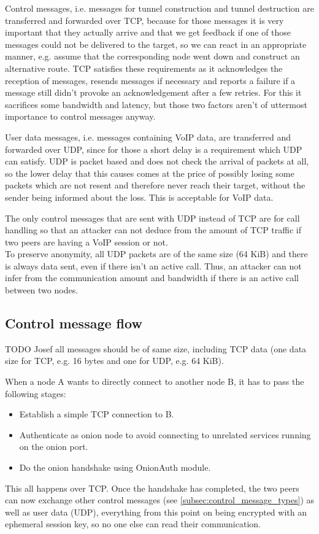 \documentclass{article}
\begin{document}
Control messages, i.e. messages for tunnel construction and tunnel destruction are transferred and forwarded over TCP, because for those messages it is very important that they actually arrive and that we get feedback if one of those messages could not be delivered to the target, so we can react in an appropriate manner, e.g. assume that the corresponding node went down and construct an alternative route. TCP satisfies these requirements as it acknowledges the reception of messages, resends messages if necessary and reports a failure if a message still didn't provoke an acknowledgement after a few retries. For this it sacrifices some bandwidth and latency, but those two factors aren't of uttermost importance to control messages anyway. 

User data messages, i.e. messages containing VoIP data, are transferred and forwarded over UDP, since for those a short delay is a requirement which UDP can satisfy. UDP is packet based and does not check the arrival of packets at all, so the lower delay that this causes comes at the price of possibly losing some packets which are not resent and therefore never reach their target, without the sender being informed about the loss. This is acceptable for VoIP data.

The only control messages that are sent with UDP instead of TCP are for call handling so that an attacker can not deduce from the amount of TCP traffic if two peers are having a VoIP session or not. \\

To preserve anonymity, all UDP packets are of the same size (64 KiB) and there is always data sent, even if there isn't an active call. Thus, an attacker can not infer from the communication amount and bandwidth if there is an active call between two nodes.


\subsection{Control message flow}
TODO Josef all messages should be of same size, including TCP data (one data size for TCP, e.g. 16 bytes and one for UDP, e.g. 64 KiB). 

When a node A wants to directly connect to another node B, it has to pass the following stages:
\begin{itemize}
	\item Establish a simple TCP connection to B.
	\item Authenticate as onion node to avoid connecting to unrelated services running on the onion port.
	\item Do the onion handshake using OnionAuth module.
\end{itemize}
This all happens over TCP. Once the handshake has completed, the two peers can now exchange other control messages (see \ref{subsec:control_message_types}) as well as user data (UDP), everything from this point on being encrypted with an ephemeral session key, so no one else can read their communication. \\
\end{document}

